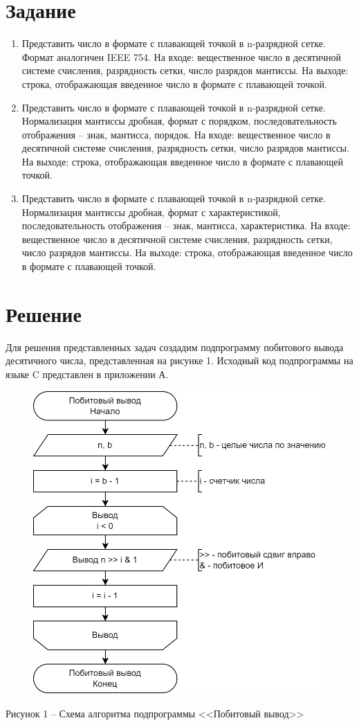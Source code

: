 \documentclass[a4paper,14pt]{extarticle}
\begin{document}
	\section*{Задание}
	\begin{enumerate}
		\item Представить число в формате с плавающей точкой в n-разрядной сетке. Формат аналогичен IEEE 754. На входе: вещественное число в десятичной системе счисления, разрядность сетки, число разрядов мантиссы. На выходе: строка, отображающая введенное число в формате с плавающей точкой.
		
		\item Представить число в формате с плавающей точкой в n-разрядной сетке. Нормализация мантиссы дробная, формат с порядком, последовательность отображения – знак, мантисса, порядок. На входе: вещественное число в десятичной системе счисления, разрядность сетки, число разрядов мантиссы. На выходе: строка, отображающая введенное число в формате с плавающей точкой.
		
		\item Представить число в формате с плавающей точкой в n-разрядной сетке. Нормализация мантиссы дробная, формат с характеристикой, последовательность отображения – знак, мантисса, характеристика. На входе: вещественное число в десятичной системе счисления, разрядность сетки, число разрядов мантиссы. На выходе: строка, отображающая введенное число в формате с плавающей точкой. 
	\end{enumerate}
	
	\newpage
	\section*{Решение}
	Для решения представленных задач создадим подпрограмму побитового вывода десятичного числа, представленная на рисунке 1. Исходный код подпрограммы на языке C представлен в приложении А.
	
	\begin{figure}[h]
		\centering
		\includegraphics[width=0.65\linewidth]{schemes/s-p}
	\end{figure}
	\begin{center}
		Рисунок 1 – Схема алгоритма подпрограммы <<Побитовый вывод>>
	\end{center}
	
\end{document}
